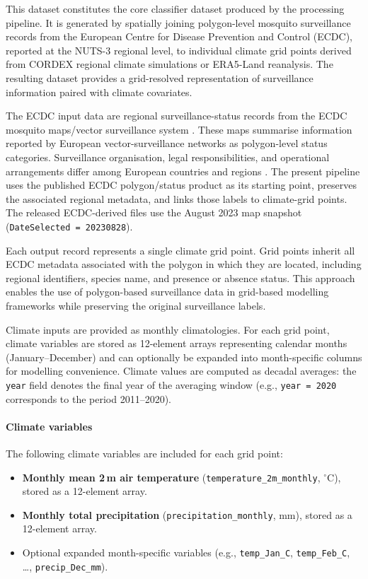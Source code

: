 \documentclass[11pt]{article}
\begin{document}
This dataset constitutes the core classifier dataset produced by the processing pipeline. It is generated by spatially joining polygon-level mosquito surveillance records from the European Centre for Disease Prevention and Control (ECDC), reported at the NUTS-3 regional level, to individual climate grid points derived from CORDEX regional climate simulations or ERA5-Land reanalysis. The resulting dataset provides a grid-resolved representation of surveillance information paired with climate covariates.

The ECDC input data are regional surveillance-status records from the ECDC
mosquito maps/vector surveillance system \cite{ecdc_mosquito_maps}. These maps
summarise information reported by European vector-surveillance networks as
polygon-level status categories. Surveillance organisation, legal
responsibilities, and operational arrangements differ among European countries
and regions \cite{ecdc2021_vector_surveillance}. The present pipeline uses the
published ECDC polygon/status product as its starting point, preserves the
associated regional metadata, and links those labels to climate-grid points.
The released ECDC-derived files use the August 2023 map snapshot
(\texttt{DateSelected~=~20230828}).

Each output record represents a single climate grid point. Grid points inherit all ECDC metadata associated with the polygon in which they are located, including regional identifiers, species name, and presence or absence status. This approach enables the use of polygon-based surveillance data in grid-based modelling frameworks while preserving the original surveillance labels.

Climate inputs are provided as monthly climatologies. For each grid point, climate variables are stored as 12-element arrays representing calendar months (January–December) and can optionally be expanded into month-specific columns for modelling convenience. Climate values are computed as decadal averages: the \texttt{year} field denotes the final year of the averaging window (e.g., \texttt{year = 2020} corresponds to the period 2011--2020).

\paragraph{Climate variables}
The following climate variables are included for each grid point:
\begin{itemize}
    \item \textbf{Monthly mean 2\,m air temperature} (\texttt{temperature\_2m\_monthly}, $^{\circ}$C), stored as a 12-element array.
    \item \textbf{Monthly total precipitation} (\texttt{precipitation\_monthly}, mm), stored as a 12-element array.
    \item Optional expanded month-specific variables (e.g., \texttt{temp\_Jan\_C}, \texttt{temp\_Feb\_C}, \ldots, \texttt{precip\_Dec\_mm}).
\end{itemize}
\end{document}
